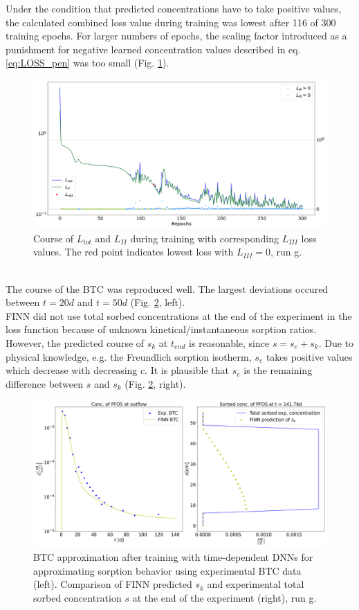 Under the condition that predicted concentrations have to take positive values, the calculated combined loss value during training was lowest after 116 of 300 training epochs. For larger numbers of epochs, the scaling factor introduced as a punishment for negative learned concentration values described in eq. \ref{eq:LOSS_pen} was too small (Fig. \ref{fig:res_loss_exp_FGR}).
\begin{figure}[h!]
	\centering
	\includegraphics[width=\textwidth]{images/res_loss_exp_FGR.png}
\caption[Loss, run g]{Course of $L_{tot}$ and $L_{II}$ during training with corresponding $L_{III}$ loss values. The red point indicates lowest loss with $L_{III}=0$, run g.}
\label{fig:res_loss_exp_FGR}
\end{figure}\\
The course of the BTC was reproduced well. The largest deviations occured between $t=20 d$ and $t = 50 d$ (Fig. \ref{fig:res_btc_exp_FGR}, left).\\
FINN did not use total sorbed concentrations at the end of the experiment in the loss function because of unknown kinetical/instantaneous sorption ratios. However, the predicted course of $s_k$ at $t_{end}$ is reasonable, since $s = s_e + s_k$. Due to physical knowledge, e.g. the Freundlich sorption isotherm, $s_e$ takes positive values which decrease with decreasing $c$. It is plausible that $s_e$ is the remaining difference between $s$ and $s_k$ (Fig. \ref{fig:res_btc_exp_FGR}, right).
\begin{figure}[h!]
	\centering
	\includegraphics[width=\textwidth]{images/res_btc_exp_FGR.png}
\caption[FINN predicted BTC, run g]{BTC approximation after training with time-dependent DNNs for approximating sorption behavior using experimental BTC data (left). Comparison of FINN predicted $s_k$ and experimental total sorbed concentration $s$ at the end of the experiment (right), run g.}
\label{fig:res_btc_exp_FGR}
\end{figure}\\
